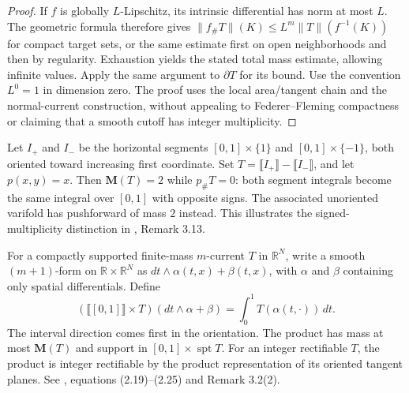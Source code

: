 \begin{proof}
If $f$ is globally $L$-Lipschitz, its intrinsic differential has norm at most $L$. The geometric formula therefore gives $\|f_\#T\|(K)\leq L^m\|T\|(f^{-1}(K))$ for compact target sets, or the same estimate first on open neighborhoods and then by regularity. Exhaustion yields the stated total mass estimate, allowing infinite values. Apply the same argument to $\partial T$ for its bound. Use the convention $L^0=1$ in dimension zero. The proof uses the local area/tangent chain and the normal-current construction, without appealing to Federer--Fleming compactness or claiming that a smooth cutoff has integer multiplicity.
\end{proof}

\begin{example}\label{ex:current-projection-cancellation}
Let $I_+$ and $I_-$ be the horizontal segments $[0,1]\times\{1\}$ and $[0,1]\times\{-1\}$, both oriented toward increasing first coordinate. Set $T=\llbracket I_+\rrbracket-\llbracket I_-\rrbracket$, and let $p(x,y)=x$. Then $\mathbf M(T)=2$ while $p_\#T=0$: both segment integrals become the same integral over $[0,1]$ with opposite signs. The associated unoriented varifold has pushforward of mass $2$ instead. This illustrates the signed-multiplicity distinction in \cite{Sim18}, Remark 3.13.
\end{example}

\begin{definition}\label{def:current-interval-product}
For a compactly supported finite-mass $m$-current $T$ in $\mathbb R^N$, write a smooth $(m+1)$-form on $\mathbb R\times\mathbb R^N$ as $dt\wedge\alpha(t,x)+\beta(t,x)$, with $\alpha$ and $\beta$ containing only spatial differentials. Define
\[
 (\llbracket[0,1]\rrbracket\times T)(dt\wedge\alpha+\beta)
 =\int_0^1 T(\alpha(t,\cdot))\,dt.
\]
The interval direction comes first in the orientation. The product has mass at most $\mathbf M(T)$ and support in $[0,1]\times\operatorname{spt}T$. For an integer rectifiable $T$, the product is integer rectifiable by the product representation of its oriented tangent planes. See \cite{Sim18}, equations (2.19)--(2.25) and Remark 3.2(2).
\end{definition}

